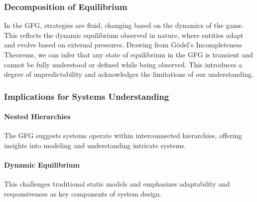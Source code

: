 \documentclass[sn-nature]{sn-jnl}%
\theoremstyle{thmstyleone}%
\theoremstyle{thmstyletwo}%
\theoremstyle{thmstylethree}%
\begin{document}
\subsubsection{Decomposition of Equilibrium}
In the GFG, strategies are fluid, changing based on the dynamics of the game. This reflects the dynamic equilibrium observed in nature, where entities adapt and evolve based on external pressures\cite{smith_logic_1973}.
Drawing from Gödel's Incompleteness Theorems, we can infer that any state of equilibrium in the GFG is transient and cannot be fully understood or defined while being observed. This introduces a degree of unpredictability and acknowledges the limitations of our understanding\cite{newman_structure_2003}.

\subsubsection{Implications for Systems Understanding}

\paragraph{Nested Hierarchies}
The GFG suggests systems operate within interconnected hierarchies, offering insights into modeling and understanding intricate systems\cite{ujwary-gil_organizational_2020}.
\paragraph{Dynamic Equilibrium} This challenges traditional static models and emphasizes adaptability and responsiveness as key components of system design\cite{holland_hidden_1996}.
\end{document}
